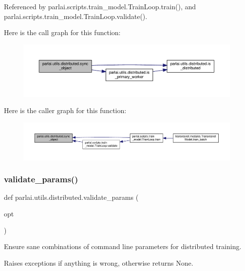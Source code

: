 Referenced by parlai.\+scripts.\+train\+\_\+model.\+Train\+Loop.\+train(), and parlai.\+scripts.\+train\+\_\+model.\+Train\+Loop.\+validate().

Here is the call graph for this function\+:
\nopagebreak
\begin{figure}[H]
\begin{center}
\leavevmode
\includegraphics[width=350pt]{namespaceparlai_1_1utils_1_1distributed_a269d3c7284127d9b287b9b61e9161de6_cgraph}
\end{center}
\end{figure}
Here is the caller graph for this function\+:
\nopagebreak
\begin{figure}[H]
\begin{center}
\leavevmode
\includegraphics[width=350pt]{namespaceparlai_1_1utils_1_1distributed_a269d3c7284127d9b287b9b61e9161de6_icgraph}
\end{center}
\end{figure}
\mbox{\label{namespaceparlai_1_1utils_1_1distributed_afd854992e4cc6571b120b9e179cd4a7a}} 
\subsubsection{\texorpdfstring{validate\+\_\+params()}{validate\_params()}}
{\footnotesize\ttfamily def parlai.\+utils.\+distributed.\+validate\+\_\+params (\begin{DoxyParamCaption}\item[{}]{opt }\end{DoxyParamCaption})}

\begin{DoxyVerb}Ensure sane combinations of command line parameters for distributed training.

Raises exceptions if anything is wrong, otherwise returns None.
\end{DoxyVerb}
 

